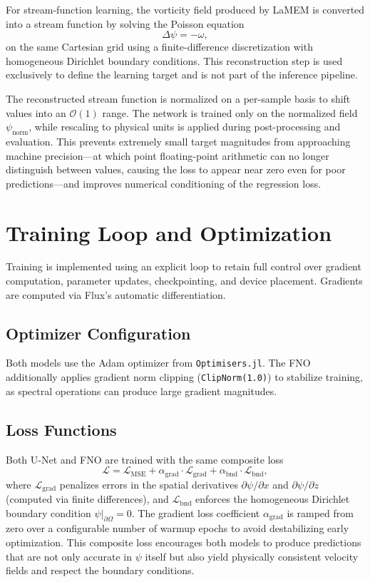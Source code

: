 For stream-function learning, the vorticity field produced by LaMEM is converted into a stream function by solving the Poisson equation
\[
\Delta \psi = -\omega,
\]
on the same Cartesian grid using a finite-difference discretization with homogeneous Dirichlet boundary conditions. This reconstruction step is used exclusively to define the learning target and is not part of the inference
pipeline.

The reconstructed stream function is normalized on a per-sample basis to shift values into an $\mathcal{O}(1)$ range. The network is trained only on the normalized field $\psi_{\mathrm{norm}}$, while rescaling to physical units is applied during post-processing and evaluation. This prevents extremely small target magnitudes from approaching machine precision—at which point floating-point arithmetic can no longer distinguish between values, causing the loss to appear near zero even for poor predictions—and improves numerical conditioning of the regression loss.

\section{Training Loop and Optimization}

Training is implemented using an explicit loop to retain full control over gradient computation, parameter updates, checkpointing, and device placement. Gradients are computed via Flux's automatic differentiation.

\subsection*{Optimizer Configuration}

Both models use the Adam optimizer from \texttt{Optimisers.jl}. The FNO additionally applies gradient norm clipping (\texttt{ClipNorm(1.0)}) to stabilize training, as spectral operations can produce large gradient magnitudes.

\subsection*{Loss Functions}

Both U-Net and FNO are trained with the same composite loss
\[
\mathcal{L} = \mathcal{L}_{\mathrm{MSE}}
+ \alpha_{\mathrm{grad}} \cdot \mathcal{L}_{\mathrm{grad}}
+ \alpha_{\mathrm{bnd}} \cdot \mathcal{L}_{\mathrm{bnd}},
\]
where $\mathcal{L}_{\mathrm{grad}}$ penalizes errors in the spatial derivatives $\partial\psi/\partial x$ and $\partial\psi/\partial z$ (computed via finite differences), and $\mathcal{L}_{\mathrm{bnd}}$ enforces the homogeneous Dirichlet boundary condition $\psi|_{\partial\Omega} = 0$. The gradient loss coefficient $\alpha_{\mathrm{grad}}$ is ramped from zero over a configurable number of warmup epochs to avoid destabilizing early optimization. This composite loss encourages both models to produce predictions that are not only accurate in $\psi$ itself but also yield physically consistent velocity fields and respect the boundary conditions.

